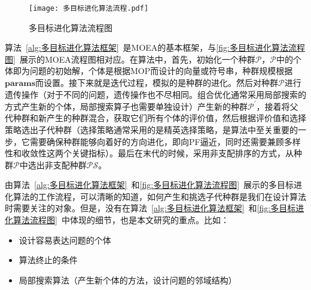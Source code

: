 \par
\begin{figure}[htb]
    \texttt{[image: 多目标进化算法流程.pdf]}
    \caption{多目标进化算法流程图}
    \label{fig:多目标进化算法流程图}
\end{figure}
\par
算法~\ref{alg:多目标进化算法框架}~是MOEA的基本框架，与\autoref{fig:多目标进化算法流程图}~展示的MOEA流程图相对应。在算法中，首先，初始化一个种群$\mathcal{P}$，$\mathcal{P}$中的个体即为问题的初始解，个体是根据MOP而设计的向量或符号串，种群规模根据$\mathbf{params}$而设置。接下来就是迭代过程，模拟的是种群的进化。然后对种群$\mathcal{P}$进行遗传操作（对于不同的问题，遗传操作也不尽相同。组合优化通常采用局部搜索的方式产生新的个体，局部搜索算子也需要单独设计）产生新的种群$\mathcal{P}^{'}$，接着将父代种群和新产生的种群混合，获取它们所有个体的评价值，然后根据评价值和选择策略选出子代种群（选择策略通常采用的是精英选择策略，是算法中至关重要的一步，它需要确保种群能够向着好的方向进化，即向PF逼近，同时还需要兼顾多样性和收敛性这两个关键指标）。最后在末代的时候，采用非支配排序的方式，从种群$\mathcal{P}$中选出非支配种群$\mathcal{PS}$。
\par
由算法~\ref{alg:多目标进化算法框架}~和\autoref{fig:多目标进化算法流程图}~展示的多目标进化算法的工作流程，可以清晰的知道，如何产生和挑选子代种群是我们在设计算法时需要关注的对象。但是，没有在算法~\ref{alg:多目标进化算法框架}~和\autoref{fig:多目标进化算法流程图}~中体现的细节，也是本文研究的重点。比如：
\begin{itemize}
    \item 设计容易表达问题的个体
    \item 算法终止的条件
    \item 局部搜索算法（产生新个体的方法，设计问题的邻域结构）
\end{itemize}

